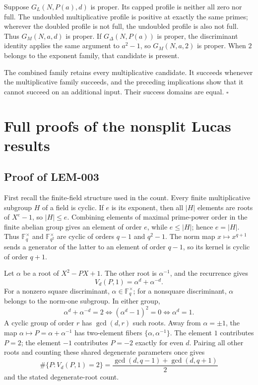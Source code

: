 \documentclass[11pt]{article}
\begin{document}
Suppose \(G_L(N,P(a),d)\) is proper. Its capped profile is neither all zero nor
full. The undoubled multiplicative profile is positive at exactly the same
primes; wherever the doubled profile is not full, the undoubled profile is
also not full. Thus \(G_M(N,a,d)\) is proper. If
\(G_\Delta(N,P(a))\) is proper, the discriminant identity applies the same
argument to \(a^2-1\), so \(G_M(N,a,2)\) is proper. When \(2\) belongs to the
exponent family, that candidate is present.

The combined family retains every multiplicative candidate. It succeeds
whenever the multiplicative family succeeds, and the preceding implications
show that it cannot succeed on an additional input. Their success domains are
equal. \(\square\)

\section{Full proofs of the nonsplit Lucas results}

\subsection{Proof of LEM-003}\label{proof:LEM-003}

First recall the finite-field structure used in the count. Every finite
multiplicative subgroup \(H\) of a field is cyclic. If \(e\) is its exponent,
then all \(|H|\) elements are roots of \(X^e-1\), so \(|H|\le e\).
Combining elements of maximal prime-power order in the finite abelian group
gives an element of order \(e\), while \(e\le|H|\); hence \(e=|H|\).
Thus \(\mathbb F_q^\times\) and
\(\mathbb F_{q^2}^\times\) are cyclic of orders \(q-1\) and \(q^2-1\).
The norm map \(x\mapsto x^{q+1}\) sends a generator of the latter to an
element of order \(q-1\), so its kernel is cyclic of order \(q+1\).

Let \(\alpha\) be a root of \(X^2-PX+1\). The other root is
\(\alpha^{-1}\), and the recurrence gives
\[
V_d(P,1)=\alpha^d+\alpha^{-d}.
\]
For a nonzero square discriminant, \(\alpha\in\mathbb F_q^\times\); for a
nonsquare discriminant, \(\alpha\) belongs to the norm-one subgroup. In either
group,
\[
\alpha^d+\alpha^{-d}=2
\Longleftrightarrow(\alpha^d-1)^2=0
\Longleftrightarrow\alpha^d=1.
\]
A cyclic group of order \(r\) has \(\gcd(d,r)\) such roots. Away from
\(\alpha=\pm1\), the map
\(\alpha\mapsto P=\alpha+\alpha^{-1}\) has two-element fibers
\(\{\alpha,\alpha^{-1}\}\). The element \(1\) contributes \(P=2\); the
element \(-1\) contributes \(P=-2\) exactly for even \(d\). Pairing all other
roots and counting these shared degenerate parameters once gives
\[
\#\{P:V_d(P,1)=2\}
=\frac{\gcd(d,q-1)+\gcd(d,q+1)}2
\]
and the stated degenerate-root count.
\end{document}
